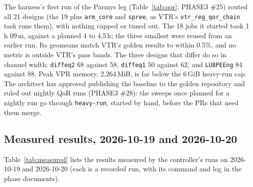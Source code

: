 \documentclass[conference]{IEEEtran}
\newcommand{\code}[1]{\texttt{#1}}
\begin{document}
The harness's first run of the Parmys leg (Table~\ref{tab:qor}; PHASE3 \#25) routed all 21
designs (the 19 plus \code{arm\_core} and \code{spree}, as VTR's \code{vtr\_reg\_qor\_chain}
task runs them), with nothing capped or timed out. The 18 jobs it started took 1\,h 09\,m,
against a planned 4 to 4.5\,h; the three smallest were reused from an earlier run. Its geomeans match VTR's golden results to within 0.5\%, and no metric is outside VTR's
pass bands. The three designs that differ do so in channel width: \code{diffeq2} 68 against 58,
\code{diffeq1} 50 against 62, and \code{LU8PEEng} 84 against 88. Peak VPR memory, 2,264\,MiB,
is far below the 6\,GiB heavy-run cap. The architect has approved publishing the baseline to
the golden repository and ruled out nightly QoR runs (PHASE3 \#28): the sweeps once planned for
a nightly run go through \code{heavy-run}, started by hand, before the PRs that need them
merge.

\subsection{Measured results, 2026-10-19 and 2026-10-20}
\label{sec:measured}

Table~\ref{tab:measured} lists the results measured by the controller's runs on 2026-10-19 and
2026-10-20 (each is a recorded run, with its command and log in the phase documents).
\end{document}
